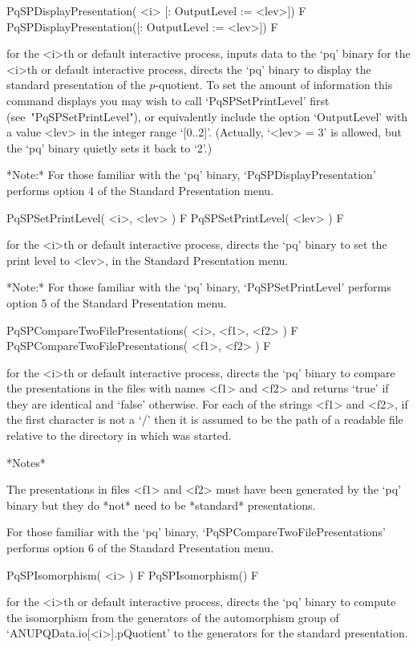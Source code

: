 \>PqSPDisplayPresentation( <i> [: OutputLevel := <lev>]) F
\>PqSPDisplayPresentation([: OutputLevel := <lev>]) F

for the <i>th or default interactive {\ANUPQ} process, inputs data to the
`pq' binary for  the  <i>th  or  default  interactive  {\ANUPQ}  process,
directs the `pq' binary to  display  the  standard  presentation  of  the
$p$-quotient. To set the amount of information this command displays  you
may wish to call `PqSPSetPrintLevel' first (see~"PqSPSetPrintLevel"),  or
equivalently include the option `OutputLevel' with a value <lev>  in  the
integer range `[0..2]'. (Actually, `<lev> = 3' is allowed, but  the  `pq'
binary quietly sets it back to `2'.)

*Note:*
For  those  familiar  with  the  `pq'  binary,  `PqSPDisplayPresentation'
performs option 4 of the Standard Presentation menu.

\>PqSPSetPrintLevel( <i>, <lev> ) F
\>PqSPSetPrintLevel( <lev> ) F

for the <i>th or default interactive {\ANUPQ} process, directs  the  `pq'
binary to set the print level to  <lev>,  in  the  Standard  Presentation
menu.

*Note:* For those familiar  with  the  `pq'  binary,  `PqSPSetPrintLevel'
performs option 5 of the Standard Presentation menu.

\>PqSPCompareTwoFilePresentations( <i>, <f1>, <f2> ) F
\>PqSPCompareTwoFilePresentations( <f1>, <f2> ) F

for the <i>th or default interactive {\ANUPQ} process, directs  the  `pq'
binary to compare the presentations in the files with names <f1> and <f2>
and returns `true' if they are identical and `false' otherwise. For  each
of the strings <f1> and <f2>, if the first character is not a `/' then it
is assumed to be the path of a readable file relative to the directory in
which {\GAP} was started.

*Notes*

The presentations in files <f1> and <f2> must have been generated by  the
`pq' binary but they do *not* need to be *standard* presentations.

For      those      familiar      with      the       `pq'       binary,
`PqSPCompareTwoFilePresentations' performs  option  6  of  the  Standard
Presentation menu.

\>PqSPIsomorphism( <i> ) F
\>PqSPIsomorphism() F

for the <i>th or default interactive {\ANUPQ} process, directs  the  `pq'
binary to compute the isomorphism from the generators of the automorphism
group of `ANUPQData.io[<i>].pQuotient' to the generators for the standard
presentation.

